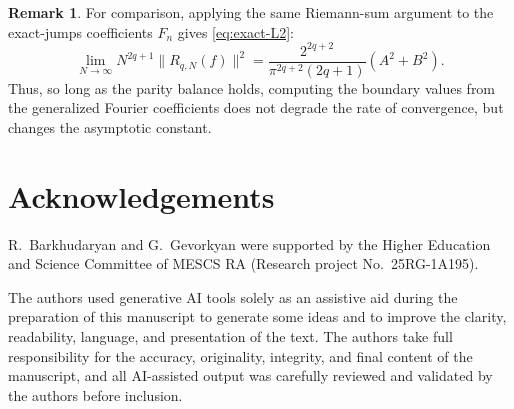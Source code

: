 \documentclass[11pt,a4paper]{article}
\theoremstyle{definition}
\newtheorem{remark}[theorem]{Remark}
\begin{document}
\begin{remark}\label{rem:reduction}
For comparison, applying the same Riemann-sum argument to the
exact-jumps coefficients $F_n$ gives \eqref{eq:exact-L2}:
\[
\lim_{N\to\infty}N^{2q+1}\|R_{q,N}(f)\|^2
=
\frac{2^{2q+2}}{\pi^{2q+2}(2q+1)}(A^2+B^2).
\]
Thus, so long as the parity balance holds, computing the boundary
values from the generalized Fourier coefficients does not degrade the
rate of convergence, but changes the asymptotic constant.
\end{remark}

\section*{Acknowledgements}
R.~Barkhudaryan and G.~Gevorkyan were supported by the Higher Education and Science Committee of MESCS RA (Research project No.~25RG-1A195).

The authors used generative AI tools solely as an assistive aid during the preparation of this manuscript to generate some ideas and to improve the clarity, readability, language, and presentation of the text. The authors take full responsibility for the accuracy, originality, integrity, and final content of the manuscript, and all AI-assisted output was carefully reviewed and validated by the authors before inclusion.





\end{document}
